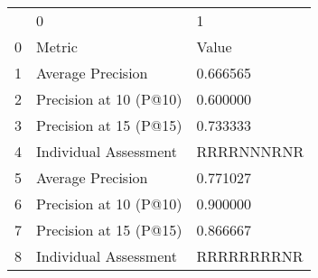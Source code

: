 \begin{tabular}{lll}
 & 0 & 1 \\
0 & Metric & Value \\
1 & Average Precision & 0.666565 \\
2 & Precision at 10 (P@10) & 0.600000 \\
3 & Precision at 15 (P@15) & 0.733333 \\
4 & Individual Assessment & RRRRNNNRNR \\
5 & Average Precision & 0.771027 \\
6 & Precision at 10 (P@10) & 0.900000 \\
7 & Precision at 15 (P@15) & 0.866667 \\
8 & Individual Assessment & RRRRRRRRNR \\
\end{tabular}
